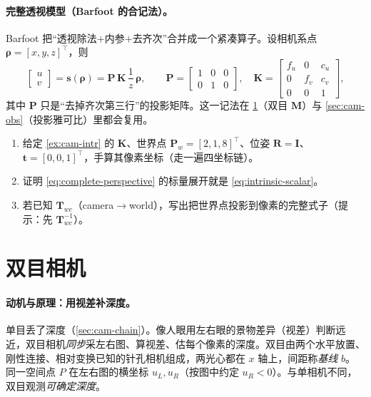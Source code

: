 \paragraph{完整透视模型（Barfoot 的合记法）。}
Barfoot\cite{barfoot2024state} 把“透视除法$+$内参$+$去齐次”合并成一个紧凑算子。设相机系点 $\boldsymbol\rho=[x,y,z]^\top$，则
\begin{equation}
  \begin{bmatrix}u\\v\end{bmatrix}=\mathbf{s}(\boldsymbol\rho)=\mathbf{P}\,\mathbf{K}\,\frac1z\,\boldsymbol\rho,\qquad
  \mathbf{P}=\begin{bmatrix}1&0&0\\0&1&0\end{bmatrix},\quad
  \mathbf{K}=\begin{bmatrix}f_u&0&c_u\\0&f_v&c_v\\0&0&1\end{bmatrix},
  \label{eq:complete-perspective}
\end{equation}
其中 $\mathbf{P}$ 只是“去掉齐次第三行”的投影矩阵。这一记法在 \cref{sec:cam-stereo}（双目 $\mathbf{M}$）与 \cref{sec:cam-obs}（投影雅可比）里都会复用。

\begin{practice}
\begin{enumerate}
  \item 给定 \cref{ex:cam-intr} 的 $\mathbf{K}$、世界点 $\mathbf{P}_w=[2,1,8]^\top$、位姿 $\mathbf{R}=\mathbf{I}$、$\mathbf{t}=[0,0,1]^\top$，手算其像素坐标（走一遍四坐标链）。
  \item 证明 \cref{eq:complete-perspective} 的标量展开就是 \cref{eq:intrinsic-scalar}。
  \item 若已知 $\mathbf{T}_{wc}$（camera$\to$world），写出把世界点投影到像素的完整式子（提示：先 $\mathbf{T}_{wc}^{-1}$）。
\end{enumerate}
\end{practice}

\section{双目相机}
\label{sec:cam-stereo}

\paragraph{动机与原理：用视差补深度。}
单目丢了深度（\cref{sec:cam-chain}）。像人眼用左右眼的景物差异（视差）判断远近，双目相机\emph{同步}采左右图、算视差、估每个像素的深度\cite{gaoxiang2019slam14}。双目由两个水平放置、刚性连接、相对变换已知的针孔相机组成，两光心都在 $x$ 轴上，间距称\emph{基线} $b$。同一空间点 $P$ 在左右图的横坐标 $u_L,u_R$（按图中约定 $u_R<0$）。与单相机不同，双目观测\emph{可确定深度}\cite{barfoot2024state}。


